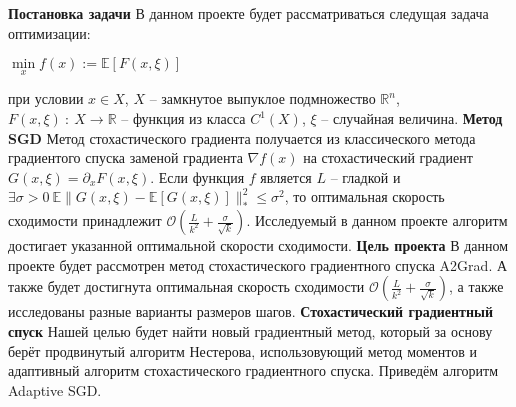 \documentclass[oneside,final,12pt]{article}
\begin{document}
\noindent\textbf{\Large{Постановка задачи}}\newline\break
В данном проекте будет рассматриваться следущая задача оптимизации:\newline
\centerline{$\min\limits_{x} f(x) := \mathbb{E}[F(x, \xi)]$}\newline
при условии $x\in X$, $X$ -- замкнутое выпуклое подмножество $\mathbb{R}^n$, $F(x, \xi)\ :\ X \to \mathbb{R}$ -- функция из класса $C^1(X)$, $\xi$ -- случайная величина.\newline
\break\noindent\textbf{\Large{Метод SGD}}\newline\break
Метод стохастического градиента получается из классического метода градиентого спуска заменой градиента $\nabla f(x)$ на стохастический
градиент $G(x, \xi) = \partial_x F(x, \xi)$. Если функция $f$ является $L$ -- гладкой и $\exists\sigma > 0\ \mathbb{E}\|G(x, \xi) - \mathbb{E}[G(x, \xi)]\|^2_{*} \le \sigma^2$, то оптимальная скорость сходимости принадлежит $\mathcal{O}(\frac{L}{k^2} + \frac{\sigma}{\sqrt{k}})$. Исследуемый в данном проекте алгоритм достигает указанной оптимальной скорости сходимости. \newline
\break\noindent\textbf{\Large{Цель проекта}}\newline\break
В данном проекте будет рассмотрен метод стохастического градиентного спуска A2Grad.
А также будет достигнута оптимальная скорость сходимости $\mathcal{O}(\frac{L}{k^2} + \frac{\sigma}{\sqrt{k}})$, а также исследованы разные варианты размеров шагов.\newline
\break\noindent\textbf{\Large{Стохастический градиентный спуск}}\newline\break
Нашей целью будет найти новый градиентный метод, который за основу берёт продвинутый алгоритм Нестерова, использовующий метод моментов и адаптивный алгоритм стохастического градиентного спуска.\newline
Приведём алгоритм Adaptive SGD. 
 
\end{document}
